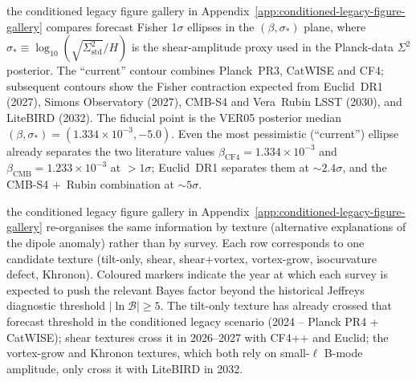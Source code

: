 the conditioned legacy figure gallery in Appendix~\ref{app:conditioned-legacy-figure-gallery} compares forecast
Fisher 1$\sigma$ ellipses in the $(\beta, \sigma_*)$ plane, where
$\sigma_* \equiv \log_{10}(\sqrt{\Sigma^2_{\mathrm{std}}}/H)$ is the
shear-amplitude proxy used in the Planck-data $\Sigma^{2}$
posterior.  The ``current'' contour combines Planck~PR3, CatWISE and
CF4; subsequent contours show the Fisher contraction expected from
Euclid~DR1 (2027), Simons Observatory (2027), CMB-S4 and Vera~Rubin
LSST (2030), and LiteBIRD (2032).  The fiducial point is the VER05
posterior median $(\beta, \sigma_*) = (1.334 \times 10^{-3}, -5.0)$.
Even the most pessimistic (``current'') ellipse already separates the
two literature values $\beta_{\mathrm{CF4}} = 1.334 \times 10^{-3}$
and $\beta_{\mathrm{CMB}} = 1.233 \times 10^{-3}$ at $> 1\sigma$;
Euclid~DR1 separates them at $\sim 2.4\sigma$, and the CMB-S4
$+$~Rubin combination at $\sim 5\sigma$.

the conditioned legacy figure gallery in Appendix~\ref{app:conditioned-legacy-figure-gallery} re-organises the same
information by texture (alternative explanations of the dipole
anomaly) rather than by survey.  Each row corresponds to one
candidate texture (tilt-only, shear, shear$+$vortex, vortex-grow,
isocurvature defect, Khronon).  Coloured markers indicate the year at
which each survey is expected to push the relevant Bayes factor
beyond the historical Jeffreys diagnostic threshold
$|\ln\mathcal{B}| \ge 5$.  The tilt-only texture has already crossed
that forecast threshold in the conditioned legacy scenario
(2024 -- Planck PR4 + CatWISE); shear textures
cross it in 2026--2027 with CF4++ and Euclid; the vortex-grow and
Khronon textures, which both rely on small-$\ell$ B-mode amplitude,
only cross it with LiteBIRD in 2032.


